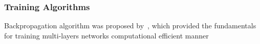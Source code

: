 \subsubsection{Training Algorithms}
Backpropagation algorithm was proposed by~\citet{werbos1975beyond}, which provided the fundamentals for training multi-layers networks computational efficient manner